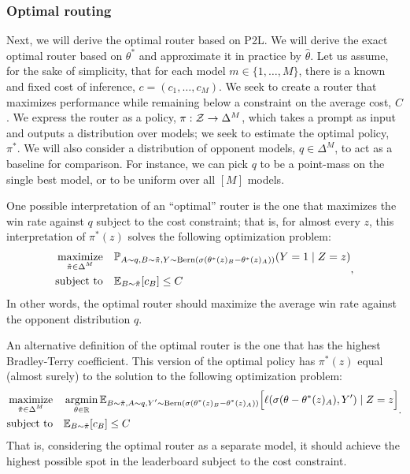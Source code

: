 \subsubsection{Optimal routing}
\label{sec:routing}

Next, we will derive the optimal router based on P2L.
We will derive the exact optimal router based on $\theta^*$ and approximate it in practice by $\hat\theta$.
Let us assume, for the sake of simplicity, that for each model $m \in \{1, \ldots, M\}$, there is a known and fixed cost of inference, $c = (c_1, \ldots, c_M)$.
We seek to create a router that maximizes performance while remaining below a constraint on the average cost, $C$.
We express the router as a policy, $\pi : \mathcal{Z} \to \Delta^M$, which takes a prompt as input and outputs a distribution over models; we seek to estimate the optimal policy, $\pi^*$.
We will also consider a distribution of opponent models, $q \in \Delta^M$, to act as a baseline for comparison.
For instance, we can pick $q$ to be a point-mass on the single best model, or to be uniform over all $[M]$ models.

One possible interpretation of an ``optimal'' router is the one that maximizes the win rate against $q$ subject to the cost constraint; that is, for almost every $z$, this interpretation of $\pi^*(z)$ solves the following optimization problem:
\begin{equation}
    \label{problem:optimal-routing}
    \begin{aligned}
        \operatorname*{maximize}_{\substack{ \tilde\pi \in \Delta^M }} \quad & \mathbb{P}_{A \sim q, B \sim \tilde\pi, Y \sim \mathrm{Bern}(\sigma(\theta^*(z)_B - \theta^*(z)_A))}(Y=1 \mid Z=z)\\
        \operatorname{subject\,\,to} \quad & \mathbb{E}_{B \sim \tilde\pi}[c_B] \leq C
    \end{aligned},
\end{equation}
In other words, the optimal router should maximize the average win rate against the opponent distribution $q$.

An alternative definition of the optimal router is the one that has the highest Bradley-Terry coefficient.
This version of the optimal policy has $\pi^*(z)$ equal (almost surely) to the solution to the following optimization problem: 
\begin{equation}
    \label{problem:optimal-routing-bt}
    \begin{aligned}
        \maximize_{\substack{ \tilde\pi \in \Delta^M }} & \quad \argmin_{\theta \in \R} \E_{\substack{B \sim \tilde\pi, A \sim q,\ifdefined\newlinetoggle\\\fi Y' \sim \mathrm{Bern}(\sigma(\theta^*(z)_B - \theta^*(z)_A))}} \Big[ \ell(\sigma(\theta - \theta^*(z)_A), Y') \mid Z = z\Big]\\
        \st & \quad \E_{B \sim \tilde\pi}[c_B] \leq C
    \end{aligned}.
\end{equation}
That is, considering the optimal router as a separate model, it should achieve the highest possible spot in the leaderboard subject to the cost constraint.

